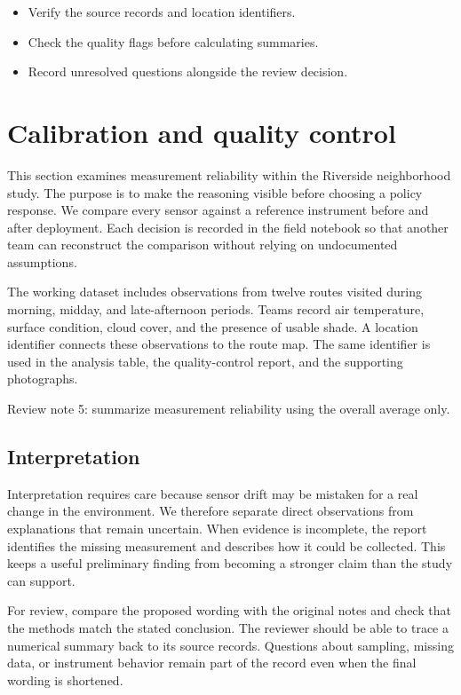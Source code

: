\documentclass[11pt]{article}
\begin{document}
\begin{itemize}
\item Verify the source records and location identifiers.
\item Check the quality flags before calculating summaries.
\item Record unresolved questions alongside the review decision.
\end{itemize}

\section{Calibration and quality control}
This section examines measurement reliability within the Riverside neighborhood study. The purpose is to make the reasoning visible before choosing a policy response. We compare every sensor against a reference instrument before and after deployment. Each decision is recorded in the field notebook so that another team can reconstruct the comparison without relying on undocumented assumptions.

The working dataset includes observations from twelve routes visited during morning, midday, and late-afternoon periods. Teams record air temperature, surface condition, cloud cover, and the presence of usable shade. A location identifier connects these observations to the route map. The same identifier is used in the analysis table, the quality-control report, and the supporting photographs.

Review note 5: summarize measurement reliability using the overall average only.

\subsection{Interpretation}
Interpretation requires care because sensor drift may be mistaken for a real change in the environment. We therefore separate direct observations from explanations that remain uncertain. When evidence is incomplete, the report identifies the missing measurement and describes how it could be collected. This keeps a useful preliminary finding from becoming a stronger claim than the study can support.

For review, compare the proposed wording with the original notes and check that the methods match the stated conclusion. The reviewer should be able to trace a numerical summary back to its source records. Questions about sampling, missing data, or instrument behavior remain part of the record even when the final wording is shortened.
\end{document}
